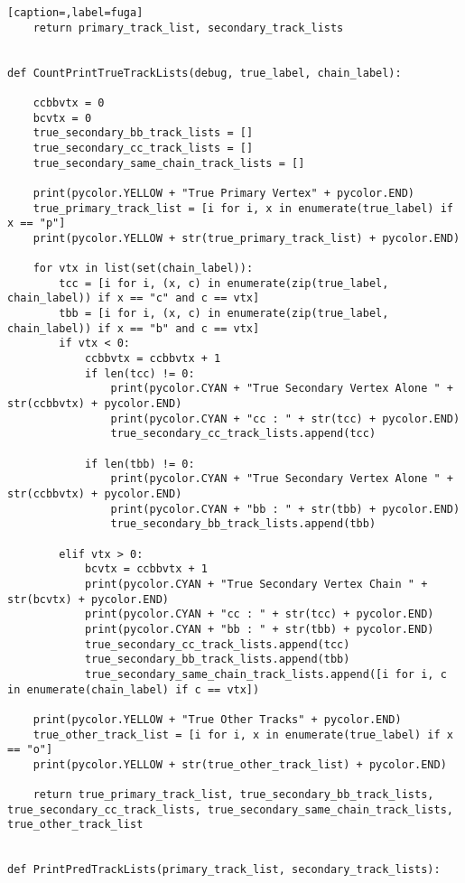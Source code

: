 \begin{lstlisting}[caption=,label=fuga]
    return primary_track_list, secondary_track_lists


def CountPrintTrueTrackLists(debug, true_label, chain_label):

    ccbbvtx = 0
    bcvtx = 0
    true_secondary_bb_track_lists = []
    true_secondary_cc_track_lists = []
    true_secondary_same_chain_track_lists = []

    print(pycolor.YELLOW + "True Primary Vertex" + pycolor.END)
    true_primary_track_list = [i for i, x in enumerate(true_label) if x == "p"]
    print(pycolor.YELLOW + str(true_primary_track_list) + pycolor.END)

    for vtx in list(set(chain_label)):
        tcc = [i for i, (x, c) in enumerate(zip(true_label, chain_label)) if x == "c" and c == vtx]
        tbb = [i for i, (x, c) in enumerate(zip(true_label, chain_label)) if x == "b" and c == vtx]
        if vtx < 0:
            ccbbvtx = ccbbvtx + 1
            if len(tcc) != 0:
                print(pycolor.CYAN + "True Secondary Vertex Alone " + str(ccbbvtx) + pycolor.END)
                print(pycolor.CYAN + "cc : " + str(tcc) + pycolor.END)
                true_secondary_cc_track_lists.append(tcc)
                
            if len(tbb) != 0:
                print(pycolor.CYAN + "True Secondary Vertex Alone " + str(ccbbvtx) + pycolor.END)
                print(pycolor.CYAN + "bb : " + str(tbb) + pycolor.END)
                true_secondary_bb_track_lists.append(tbb)

        elif vtx > 0:
            bcvtx = ccbbvtx + 1
            print(pycolor.CYAN + "True Secondary Vertex Chain " + str(bcvtx) + pycolor.END)
            print(pycolor.CYAN + "cc : " + str(tcc) + pycolor.END)
            print(pycolor.CYAN + "bb : " + str(tbb) + pycolor.END)
            true_secondary_cc_track_lists.append(tcc)
            true_secondary_bb_track_lists.append(tbb)
            true_secondary_same_chain_track_lists.append([i for i, c in enumerate(chain_label) if c == vtx])

    print(pycolor.YELLOW + "True Other Tracks" + pycolor.END)
    true_other_track_list = [i for i, x in enumerate(true_label) if x == "o"]
    print(pycolor.YELLOW + str(true_other_track_list) + pycolor.END)

    return true_primary_track_list, true_secondary_bb_track_lists, true_secondary_cc_track_lists, true_secondary_same_chain_track_lists, true_other_track_list

        
def PrintPredTrackLists(primary_track_list, secondary_track_lists):


\end{lstlisting}
